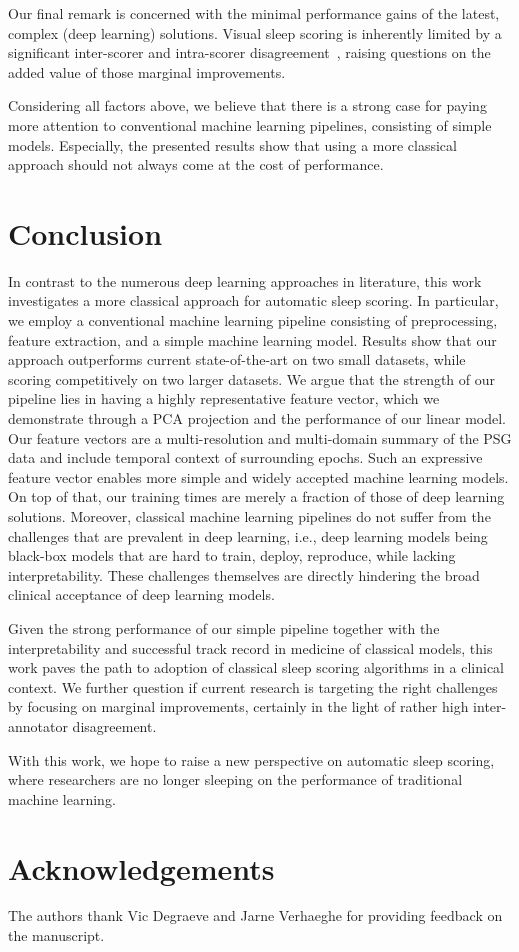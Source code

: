 \documentclass[runningheads]{llncs}
\begin{document}
Our final remark is concerned with the minimal performance gains of the latest, complex (deep learning) solutions. Visual sleep scoring is inherently limited by a significant inter-scorer and intra-scorer disagreement~\cite{rosenberg2013american}, raising questions on the added value of those marginal improvements.

Considering all factors above, we believe that there is a strong case for paying more attention to conventional machine learning pipelines, consisting of simple models. Especially, the presented results show that using a more classical approach should not always come at the cost of performance.


\section{Conclusion}\label{sec:conclusion}
In contrast to the numerous deep learning approaches in literature, this work investigates a more classical approach for automatic sleep scoring.
In particular, we employ a conventional machine learning pipeline consisting of preprocessing, feature extraction, and a simple machine learning model.
Results show that our approach outperforms current state-of-the-art on two small datasets, while scoring competitively on two larger datasets. We argue that the strength of our pipeline lies in having a highly representative feature vector, which we demonstrate through a PCA projection and the performance of our linear model. Our feature vectors are a multi-resolution and multi-domain summary of the PSG data and include temporal context of surrounding epochs. Such an expressive feature vector enables more simple and widely accepted machine learning models. On top of that, our training times are merely a fraction of those of deep learning solutions.
Moreover, classical machine learning pipelines do not suffer from the challenges that are prevalent in deep learning, i.e., deep learning models being black-box models that are hard to train, deploy, reproduce, while lacking interpretability. These challenges themselves are directly hindering the broad clinical acceptance of deep learning models.

Given the strong performance of our simple pipeline together with the interpretability and successful track record in medicine of classical models, this work paves the path to adoption of classical sleep scoring algorithms in a clinical context. We further question if current research is targeting the right challenges by focusing on marginal improvements, certainly in the light of rather high inter-annotator disagreement.

With this work, we hope to raise a new perspective on automatic sleep scoring, where researchers are no longer sleeping on the performance of traditional machine learning.

\section*{Acknowledgements}
The authors thank Vic Degraeve and Jarne Verhaeghe for providing feedback on the manuscript.




\end{document}
